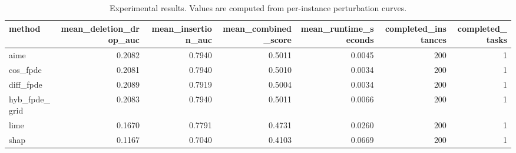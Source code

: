 \begin{table}[t]
\caption{Experimental results. Values are computed from per-instance perturbation curves.}
\label{tab:main_results_computed}
\centering
\begin{tabular}{lrrrrrr}
\toprule
method & mean\_deletion\_drop\_auc & mean\_insertion\_auc & mean\_combined\_score & mean\_runtime\_seconds & completed\_instances & completed\_tasks \\
\midrule
aime & 0.2082 & 0.7940 & 0.5011 & 0.0045 & 200 & 1 \\
cos\_fpde & 0.2081 & 0.7940 & 0.5010 & 0.0034 & 200 & 1 \\
diff\_fpde & 0.2089 & 0.7919 & 0.5004 & 0.0034 & 200 & 1 \\
hyb\_fpde\_grid & 0.2083 & 0.7940 & 0.5011 & 0.0066 & 200 & 1 \\
lime & 0.1670 & 0.7791 & 0.4731 & 0.0260 & 200 & 1 \\
shap & 0.1167 & 0.7040 & 0.4103 & 0.0669 & 200 & 1 \\
\bottomrule
\end{tabular}

\end{table}
